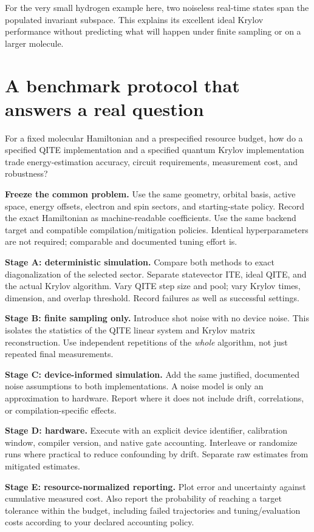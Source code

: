 \documentclass[11pt,a4paper]{article}
\newcommand{\lesson}[2]{\clearpage\section{#1}\label{#2}}
\begin{document}
For the very small hydrogen example here, two noiseless real-time states span the populated invariant subspace. This explains its excellent ideal Krylov performance without predicting what will happen under finite sampling or on a larger molecule.

\lesson{A benchmark protocol that answers a real question}{sec:benchmark}
\begin{idea}
For a fixed molecular Hamiltonian and a prespecified resource budget, how do a specified QITE implementation and a specified quantum Krylov implementation trade energy-estimation accuracy, circuit requirements, measurement cost, and robustness?
\end{idea}

\textbf{Freeze the common problem.} Use the same geometry, orbital basis, active space, energy offsets, electron and spin sectors, and starting-state policy. Record the exact Hamiltonian as machine-readable coefficients. Use the same backend target and compatible compilation/mitigation policies. Identical hyperparameters are not required; comparable and documented tuning effort is.

\textbf{Stage A: deterministic simulation.} Compare both methods to exact diagonalization of the selected sector. Separate statevector ITE, ideal QITE, and the actual Krylov algorithm. Vary QITE step size and pool; vary Krylov times, dimension, and overlap threshold. Record failures as well as successful settings.

\textbf{Stage B: finite sampling only.} Introduce shot noise with no device noise. This isolates the statistics of the QITE linear system and Krylov matrix reconstruction. Use independent repetitions of the \emph{whole} algorithm, not just repeated final measurements.

\textbf{Stage C: device-informed simulation.} Add the same justified, documented noise assumptions to both implementations. A noise model is only an approximation to hardware. Report where it does not include drift, correlations, or compilation-specific effects.

\textbf{Stage D: hardware.} Execute with an explicit device identifier, calibration window, compiler version, and native gate accounting. Interleave or randomize runs where practical to reduce confounding by drift. Separate raw estimates from mitigated estimates.

\textbf{Stage E: resource-normalized reporting.} Plot error and uncertainty against cumulative measured cost. Also report the probability of reaching a target tolerance within the budget, including failed trajectories and tuning/evaluation costs according to your declared accounting policy.
\end{document}
